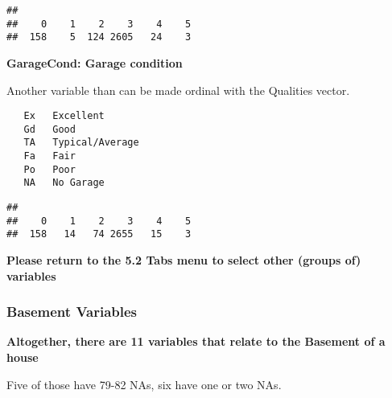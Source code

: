 \documentclass[]{article}
\newenvironment{Shaded}{\begin{snugshade}}{\end{snugshade}}
\newcommand{\KeywordTok}[1]{\textcolor[rgb]{0.13,0.29,0.53}{\textbf{#1}}}
\newcommand{\StringTok}[1]{\textcolor[rgb]{0.31,0.60,0.02}{#1}}
\newcommand{\CommentTok}[1]{\textcolor[rgb]{0.56,0.35,0.01}{\textit{#1}}}
\newcommand{\OperatorTok}[1]{\textcolor[rgb]{0.81,0.36,0.00}{\textbf{#1}}}
\newcommand{\NormalTok}[1]{#1}
\begin{document}
\begin{verbatim}
## 
##    0    1    2    3    4    5 
##  158    5  124 2605   24    3
\end{verbatim}

\textbf{GarageCond: Garage condition}

Another variable than can be made ordinal with the Qualities vector.

\begin{verbatim}
   Ex   Excellent
   Gd   Good
   TA   Typical/Average
   Fa   Fair
   Po   Poor
   NA   No Garage
\end{verbatim}

\begin{Shaded}
\end{Shaded}

\begin{verbatim}
## 
##    0    1    2    3    4    5 
##  158   14   74 2655   15    3
\end{verbatim}

\textbf{Please return to the 5.2 Tabs menu to select other (groups of)
variables}

\subsubsection{Basement Variables}\label{basement-variables}

\textbf{Altogether, there are 11 variables that relate to the Basement
of a house}

Five of those have 79-82 NAs, six have one or two NAs.

\begin{Shaded}
\end{Shaded}
\end{document}
